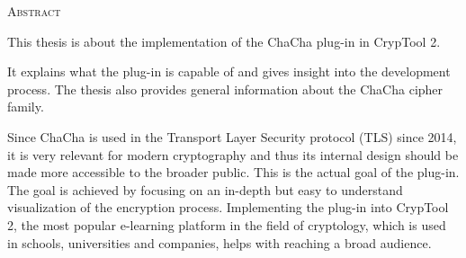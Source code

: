
\begin{center}
  \textsc{Abstract}
\end{center}

\noindent
This thesis is about the implementation of the ChaCha plug-in in CrypTool 2.

\medskip
\noindent
It explains what the plug-in is capable of and gives insight into the development process. The thesis also provides general information about the ChaCha cipher family.

\medskip
\noindent
Since ChaCha is used in the Transport Layer Security protocol (TLS) since 2014, it is very relevant for modern cryptography and thus its internal design should be made more accessible to the broader public. This is the actual goal of the plug-in. \\
The goal is achieved by focusing on an in-depth but easy to understand visualization of the encryption process. Implementing the plug-in into CrypTool 2, the most popular e-learning platform in the field of cryptology, which is used in schools, universities and companies, helps with reaching a broad audience.

